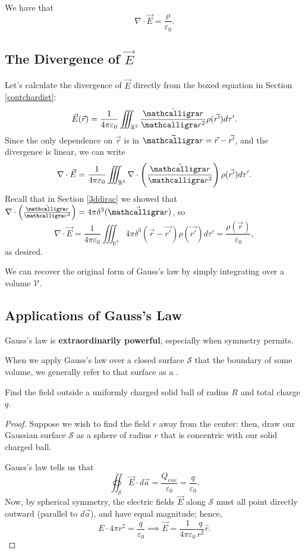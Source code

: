\begin{theorem}
    We have that
    \[\nabla\cdot\vec{E}=\frac{\rho}{\varepsilon_0}.\]
\end{theorem}

\subsection{The Divergence of $\vec{E}$}

Let's calculate the divergence of $\vec{E}$ directly from the boxed equation in Section \ref{contchardist}:
\[\vec{E}(\vec{r})=\frac{1}{4\pi\varepsilon_0}\iiint_{\mathbb{R}^3}\frac{\hat{\scr}}{\scr^2}\rho(\vec{r'})d\tau'.\]
Since the only dependence on $\vec{r}$ is in $\vec{\scr}=\vec{r}-\vec{r'}$, and the divergence is linear, we can write
\[\nabla\cdot\vec{E}=\frac{1}{4\pi\varepsilon_0}\iiint_{\mathbb{R}^3}\nabla\cdot\left(\frac{\hat{\scr}}{\scr^2}\right)\rho(\vec{r'})d\tau'.\]
Recall that in Section \ref{3ddirac} we showed that $\nabla\cdot\left(\frac{\hat{\scr}}{\scr^2}\right)=4\pi\delta^3(\vec{\scr})$,
so
\[\nabla\cdot\vec{E}=\frac{1}{4\pi\varepsilon_0}\iiint_{\mathbb{R}^3}4\pi\delta^3(\vec{r}-\vec{r'})\rho(\vec{r'})d\tau'=\frac{\rho(\vec{r})}{\varepsilon_0},\]
as desired.

We can recover the original form of Gauss's law by simply integrating over a volume $\mathcal{V}$.

\subsection{Applications of Gauss's Law}

Gauss's law is \textbf{extraordinarily powerful}, especially when symmetry permits. 

\begin{definition}
When we apply Gauss's law over a closed surface $\mathcal{S}$ that the boundary of some volume, we generally refer to that surface as a .
\end{definition}

\begin{example}
Find the field outside a uniformly charged solid ball of radius $R$ and total charge $q$.
\end{example}

\begin{proof}
Suppose we wish to find the field $r$ away from the center: then, draw our Gaussian surface $\mathcal{S}$ as a sphere of radius $r$ that is concentric with our solid charged ball.

Gauss's law tells us that 
\[\oiint_{\mathcal{S}}\vec{E}\cdot d\vec{a}=\frac{Q_{enc}}{\varepsilon_0}=\frac{q}{\varepsilon_0}.\]
Now, by spherical symmetry, the electric fields $\vec{E}$ along $\mathcal{S}$ must all point directly outward (parallel to $d\vec{a}$), and have equal magnitude; hence,
\[E\cdot 4\pi r^2=\frac{q}{\varepsilon_0}\implies \vec{E}=\boxed{\frac{1}{4\pi \varepsilon_0}\frac{q}{r^2}\hat{r}}.\]
\end{proof}

